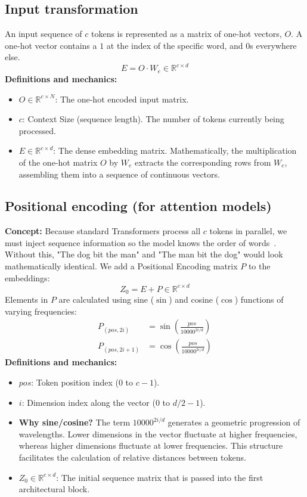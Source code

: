\documentclass[11pt]{article}
\begin{document}
	\subsection{Input transformation}
	An input sequence of $c$ tokens is represented as a matrix of one-hot vectors, $O$.
	A one-hot vector contains a $1$ at the index of the specific word, and $0$s everywhere else.
	\begin{equation}
		E = O \cdot W_e \in \mathbb{R}^{c \times d}
	\end{equation}
	\textbf{Definitions and mechanics:}
	\begin{itemize}
		\item $O \in \mathbb{R}^{c \times N}$: The one-hot encoded input matrix.
		\item $c$: Context Size (sequence length). The number of tokens currently being processed.
		\item $E \in \mathbb{R}^{c \times d}$: The dense embedding matrix.
		Mathematically, the multiplication of the one-hot matrix $O$ by $W_e$ extracts the corresponding rows from $W_e$, assembling them into a sequence of continuous vectors.
	\end{itemize}
	
	\subsection{Positional encoding (for attention models)}
	\textbf{Concept:} Because standard Transformers process all $c$ tokens in parallel, we must inject sequence information so the model knows the order of words~\cite{vaswani2017attention}.
	Without this, "The dog bit the man" and "The man bit the dog" would look mathematically identical.
	We add a Positional Encoding matrix $P$ to the embeddings:
	\begin{equation}
		Z_0 = E + P \in \mathbb{R}^{c \times d}
	\end{equation}
	Elements in $P$ are calculated using sine ($\sin$) and cosine ($\cos$) functions of varying frequencies:
	\begin{align}
		P_{(pos, 2i)} &= \sin\left(\frac{pos}{10000^{2i/d}}\right) \\
		P_{(pos, 2i+1)} &= \cos\left(\frac{pos}{10000^{2i/d}}\right)
	\end{align}
	\textbf{Definitions and mechanics:}
	\begin{itemize}
		\item $pos$: Token position index ($0$ to $c-1$).
		\item $i$: Dimension index along the vector ($0$ to $d/2 - 1$).
		\item \textbf{Why sine/cosine?} The term $10000^{2i/d}$ generates a geometric progression of wavelengths.
		Lower dimensions in the vector fluctuate at higher frequencies, whereas higher dimensions fluctuate at lower frequencies.
		This structure facilitates the calculation of relative distances between tokens.
		\item $Z_0 \in \mathbb{R}^{c \times d}$: The initial sequence matrix that is passed into the first architectural block.
	\end{itemize}
	
\end{document}

